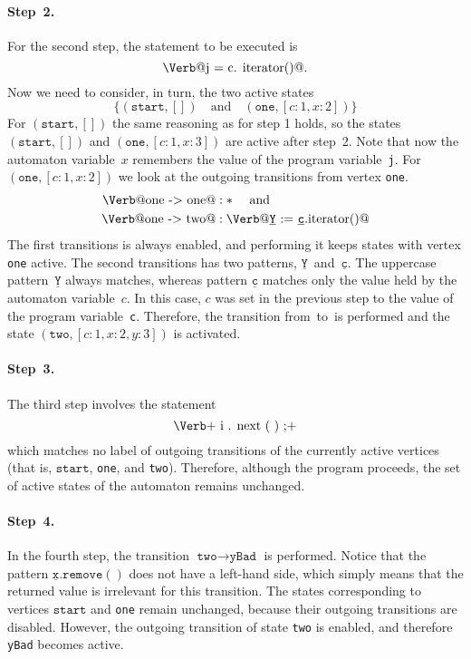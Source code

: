\documentclass[9pt, preprint]{sigplanconf} %
\makeatletter
\newcommand{\pattern}[1]{\ensuremath{\mathtt{\underline{#1}}}}
\newcommand{\start}{\ensuremath{\mathtt{start}}\xspace}
\newcommand{\verbline}[2][]{\[\text{\Verb@#2@}#1\]}
\theoremstyle{definition}
\theoremstyle{remark}
\makeatother
\begin{document}
\paragraph{Step~2.}
For the second step, the statement to be executed is \verbline[.]{j = c.\PY{n+na}{iterator}()}
Now we need to consider, in turn, the two active states \[\{(\start,[])\quad\text{and}\quad(\texttt{one},[c:1,x:2])\}\]
For $(\start,[])$ the same reasoning as for step 1 holds, so the states $(\start,[])$ and $(\mathtt{one},[c:1,x:3])$ are active after step~2.
Note that now the automaton variable~$x$ remembers the value of the program variable~{\tt j}.
For $(\texttt{one},[c:1,x:2])$ we look at the outgoing transitions from vertex {\tt one}.
\begin{align*}
\text{\Verb@one -> one@} &: * \quad \mbox{ and } \quad \\
\text{\Verb@one -> two@} &: \text{\Verb@\pattern Y := \pattern c.iterator()@}
\end{align*}
The first transitions is always enabled, and performing it keeps states with vertex \texttt{one} active.
The second transitions has two patterns, \pattern Y~and~\pattern c.
The uppercase pattern~\pattern Y always matches, whereas
pattern \pattern c matches only the value held by the automaton variable~$c$.
In this case, $c$ was set in the previous step to the value of the program variable~\texttt{c}.
Therefore, the transition from~\Verb@one@ to~\Verb@two@ is performed and the state $(\mathtt{two},[c:1,x:2,y:3])$ is activated.

\paragraph{Step~3.}

The third step involves the statement
\[\text{\Verb+\PY{n}{i}\PY{o}{.}\PY{n+na}{next}\PY{o}{(}\PY{o}{)}\PY{o}{;}+}\]
which matches no label of outgoing transitions of the currently active vertices (that is, \start, {\tt one}, and {\tt  two}).
Therefore, although the program proceeds, the set of active states of the automaton remains unchanged.

\paragraph{Step~4.}

In the fourth step, the transition $\texttt{two}\to\texttt{yBad}$ is performed.
Notice that the pattern $\pattern{x}.\mathtt{remove}()$ does not have a left-hand side, which simply means that the returned value is irrelevant for this transition.
The states corresponding to vertices \start and {\tt one} remain unchanged, because their outgoing transitions are disabled.
However,  the outgoing transition of state {\tt two} is enabled, and therefore {\tt yBad} becomes active.
\end{document}
